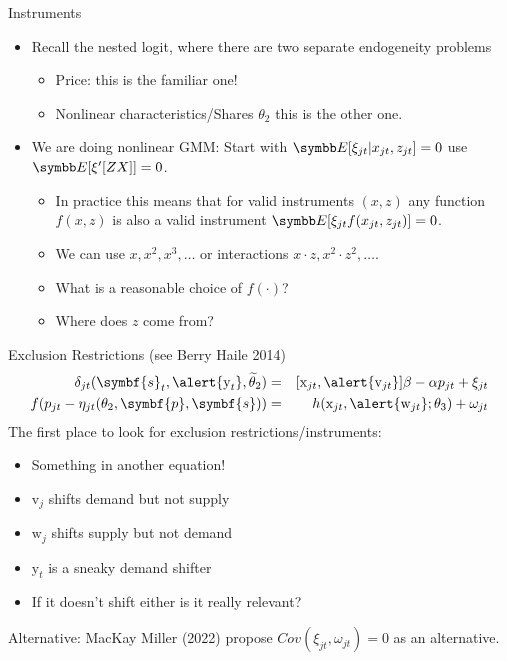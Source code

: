 \documentclass[aspectratio=169,10pt]{beamer}
\begin{document}
\begin{frame}{Instruments}
\begin{itemize}
\item Recall the nested logit, where there are two separate endogeneity problems
\begin{itemize}
\item \alert{Price}: this is the familiar one!
\item \alert{Nonlinear characteristics/Shares} $\theta_2$ this is the other one.
\end{itemize}
\item We are doing nonlinear GMM: Start with $\E[\xi_{jt} | x_{jt}, z_{jt}]=0$ use $\E[\xi' [Z X]]=0$.
\begin{itemize}
\item In practice this means that for valid instruments $(x,z)$ any function $f(x,z)$ is also a valid instrument $\E[ \xi_{jt} f(x_{jt},z_{jt})]=0$.
\item We can use $x, x^2, x^3,\ldots$ or interactions $x \cdot z, x^2 \cdot z^2, \ldots$.
\item What is a reasonable choice of $f(\cdot)$?
\item Where does $z$ come from?
\end{itemize}
\end{itemize}
\end{frame}



\begin{frame}{Exclusion Restrictions (see Berry Haile 2014)}
\begin{eqnarray*}
    \delta_{jt}(\symbf{s}_t,\alert{\textrm{y}_t}, \widetilde{\theta}_2) &=&  [\textrm{x}_{jt}, \alert{\textrm{v}_{jt}}]  \beta  - \alpha p_{jt} + \xi_{jt}\\
    f(p_{jt} - \eta_{jt}(\theta_2,\symbf{p},\symbf{s})) &=&   h(\textrm{x}_{jt},\alert{\textrm{w}_{jt}};\theta_3)+\omega_{jt}
\end{eqnarray*}
The first place to look for exclusion restrictions/instruments:
\begin{itemize}
\item Something in another equation!
\item $\textrm{v}_j$ shifts demand but not supply
\item $\textrm{w}_j$ shifts supply but not demand
\item $\textrm{y}_t$ is a sneaky demand shifter
\item If it doesn't shift either is it really relevant?
\end{itemize}
Alternative: MacKay Miller (2022) propose $Cov(\xi_{jt},  \omega_{jt})=0$ as an alternative.
\end{frame}
\end{document}
